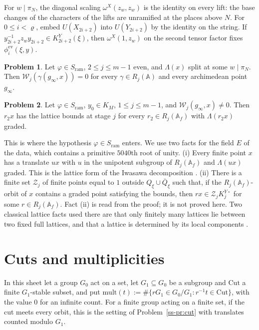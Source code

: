 \documentclass[reqno]{amsart}
\theoremstyle{definition}
\newtheorem{problem}{Problem}[section]
\theoremstyle{plain}
\theoremstyle{remark}
\newcommand{\A}{\mathbb{A}}
\newcommand{\Af}{\mathbb{A}_f}
\newcommand{\Wc}{\mathcal{W}}
\newcommand{\Cut}{\mathrm{Cut}}
\newcommand{\mult}{\mathrm{mult}}
\newcommand{\ev}{\mathrm{ev}}
\newcommand{\Sr}{S_{\mathrm{ram}}}
\newcommand{\KYo}[1]{K^{Y\circ}_{#1}}
\newcommand{\KY}[1]{K^{Y}_{#1}(\xi)}
\begin{document}
For \(w\mid\pi_N\), the diagonal scaling \(\omega^X(z_w,z_w)\) is the identity on every lift: the base changes of the characters of the lifts are unramified at the places above \(N\).  For \(0\le i<\varrho\), embed \(U(X_{2i+2})\) into \(U(Y_{2i+2})\) by the identity on the string.  If \(y_{2i+2}^{-1}z_wy_{2i+2}\in\KY{2i+2}\), then \(\omega^X(1,z_w)\) on the second tensor factor fixes \(\phi^{\ev}_i(\xi,y)\).

\begin{problem}\label{pr:vanish}
Let \(\varphi\in\Sr\), \(2\le j\le m-1\) even, and \(\Lambda(x)\) split at some \(w\mid\pi_N\).  Then \(\Wc_j(\gamma(g_\infty,x))=0\) for every \(\gamma\in R_j(\A)\) and every archimedean point \(g_\infty\).
\end{problem}

\begin{problem}\label{pr:bounds}
Let \(\varphi\in\Sr\), \(y_0\in K_M\), \(1\le j\le m-1\), and \(\Wc_j(g_\infty,x)\ne0\).  Then \(r_2x\) has the lattice bounds at stage \(j\) for every \(r_2\in R_j(\Af)\) with \(\Lambda(r_2x)\) graded.
\end{problem}

This is where the hypothesis \(\varphi\in\Sr\) enters.  We use two facts for the field \(E\) of the data, which contains a primitive \(5040\)th root of unity.  (i) Every finite point \(x\) has a translate \(ux\) with \(u\) in the unipotent subgroup of \(R_j(\Af)\) and \(\Lambda(ux)\) graded.  This is the lattice form of the Iwasawa decomposition \cite[3.3.2]{Ti}.  (ii) There is a finite set \(\mathcal Z_j\) of finite points equal to \(1\) outside \(Q_\xi\cup\bar Q_\xi\) such that, if the \(R_j(\Af)\)-orbit of \(x\) contains a graded point satisfying the bounds, then \(rx\in \mathcal Z_j\KYo j\) for some \(r\in R_j(\Af)\).  Fact (ii) is read from the proof; it is not proved here.  Two classical lattice facts used there are that only finitely many lattices lie between two fixed full lattices, and that a lattice is determined by its local components \cite{OM}.


\section{Cuts and multiplicities}\label{sec:cuts}

In this sheet let a group \(G_0\) act on a set, let \(G_1\subseteq G_0\) be a subgroup and \(\Cut\) a finite \(G_1\)-stable subset, and put \(\mult(t):=\#\{rG_1\in G_0/G_1 : r^{-1}t\in\Cut\}\), with the value \(0\) for an infinite count.  For a finite group acting on a finite set, if the cut meets every orbit, this is the setting of Problem~\ref{ss-pr:cut} with translates counted modulo \(G_1\).
\end{document}
